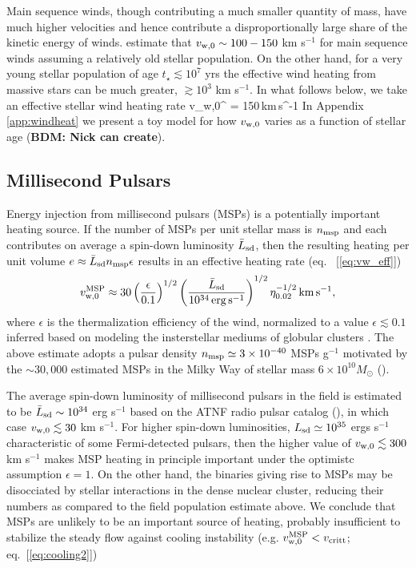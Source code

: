 \documentclass[usenatbib,fleqn]{mn2e}
\begin{document}
Main sequence winds, though contributing a much smaller quantity of
mass, have much higher velocities and hence contribute a
disproportionally large share of the kinetic energy of winds.
\citet{NaimanSoares-Furtado+:2013a} estimate that $v_{\rm w,0} \sim
100-150$ km s$^{-1}$ for main sequence winds assuming a relatively old
stellar population.  On the other hand, for a very young stellar
population of age $t_{\star} \lesssim 10^{7}$ yrs the effective wind
heating from massive stars can be much greater, $\gtrsim 10^{3}$ km
s$^{-1}$.  In what follows below, we take an effective stellar wind
heating rate \be v_{\rm w,0}^{\star} = 150\,{\rm km\,s^{-1}} \ee In
Appendix \ref{app:windheat} we present a toy model for how $v_{\rm
  w,0}$ varies as a function of stellar age ({\bf BDM: Nick can
  create}).

\subsection{Millisecond Pulsars} Energy injection from millisecond pulsars (MSPs) is a potentially important heating source.  If the number of MSPs per unit stellar mass is $n_{\rm msp}$ and each contributes on average a spin-down luminosity $\bar{L}_{\rm sd}$, then the resulting heating per unit volume $e \approx \bar{L}_{\rm sd}n_{\rm
  msp}\epsilon$ results in an effective heating rate (eq.~ [\ref{eq:vw_eff}])
\begin{eqnarray}
  v_{\rm w,0}^{\rm MSP} \approx 30\left(\frac{\epsilon}{0.1}\right)^{1/2}\left(\frac{\bar{L}_{\rm
        sd}}{10^{34}\,{\rm erg\,s^{-1}}}\right)^{1/2}
  \eta_{0.02}^{-1/2}\,{\rm km\,s^{-1}},
  \end{eqnarray}
where $\epsilon$ is the thermalization efficiency of the wind, normalized to a value $\epsilon \lesssim 0.1$ inferred based on modeling the insterstellar mediums of globular clusters \citep{NaimanSoares-Furtado+:2013a}.  The above estimate adopts a pulsar density $n_{\rm msp}\simeq3 \times 10^{-40} $ MSPs g$^{-1}$ motivated by the $\sim 30,000$ estimated MSPs in the Milky Way of stellar mass $6\times 10^{10}M_{\odot}$ (\citealt{Lorimer13}).  

The average spin-down luminosity of millisecond pulsars in the field is estimated to be $\bar{L}_{\rm sd} \sim 10^{34}$ erg s$^{-1}$ based on the ATNF radio pulsar catalog (\citealt{Manchester+05}), in which case $v_{\rm w,0} \lesssim 30$ km s$^{-1}$.  For higher spin-down luminosities, $L_{\rm sd}\simeq 10^{35}$ ergs s$^{-1}$ characteristic of some Fermi-detected pulsars, then the higher value of $v_{\rm w,0} \lesssim 300$ km s$^{-1}$ makes MSP heating in principle important under the optimistc assumption $\epsilon = 1$.  On the other hand, the binaries giving rise to MSPs may be disocciated by stellar interactions in the dense nuclear cluster, reducing their numbers as compared to the field population estimate above.  We conclude that MSPs are unlikely to be an important source of heating, probably insufficient to stabilize the steady flow against cooling instability (e.g. $v_{\rm w,0}^{\rm MSP} < v_{\rm critt}$; eq.~[\ref{eq:cooling2}])  
\end{document}

